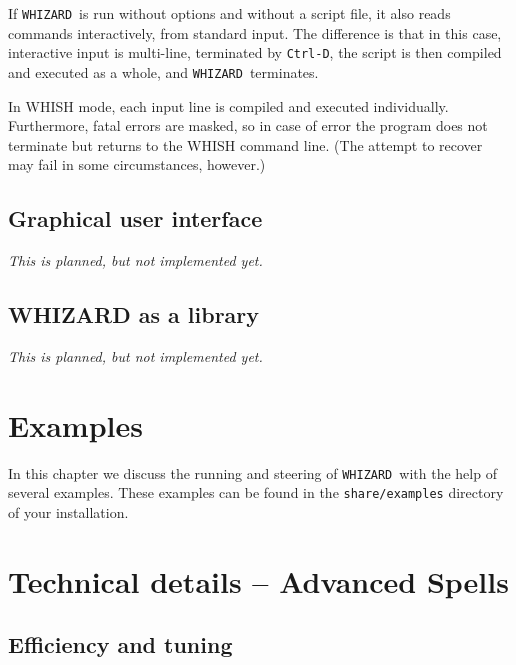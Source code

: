 \documentclass[12pt]{book}
\newcommand{\ttt}[1]{\texttt{#1}}
\newcommand{\whizard}{\texttt{WHIZARD}}
\begin{document}
If \whizard\ is run without options and without a script file, it
also reads commands interactively, from standard input.  The
difference is that in this case, interactive input is multi-line,
terminated by \ttt{Ctrl-D}, the script is then compiled and
executed as a whole, and \whizard\ terminates.

In WHISH mode, each input line is compiled and executed individually.
Furthermore, fatal errors are masked, so in case of error the program
does not terminate but returns to the WHISH command line.  (The
attempt to recover may fail in some circumstances, however.)


\section{Graphical user interface}

\emph{This is planned, but not implemented yet.}


\section{WHIZARD as a library}

\emph{This is planned, but not implemented yet.}


\chapter{Examples}
\label{chap:examples}

In this chapter we discuss the running and steering of \whizard\ with
the help of several examples. These examples can be found in the
\ttt{share/examples} directory of your installation.


\chapter{Technical details -- Advanced Spells}
\label{chap:tuning}

\section{Efficiency and tuning}
\end{document}
